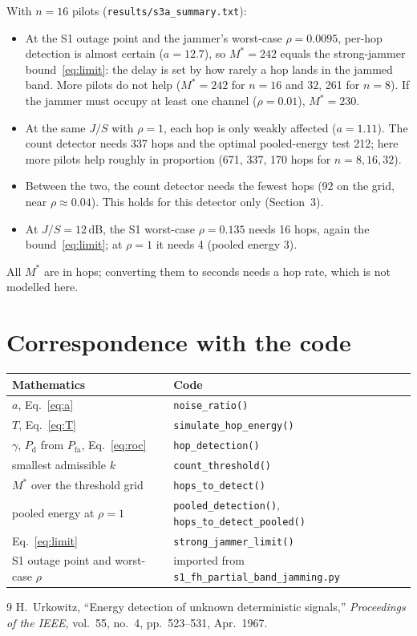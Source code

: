 \documentclass[11pt,a4paper]{article}
\newcommand{\Pfa}{P_{\mathrm{fa}}}
\newcommand{\Pd}{P_{\mathrm{d}}}
\begin{document}
With $n=16$ pilots (\texttt{results/s3a\_summary.txt}):
\begin{itemize}[leftmargin=*,itemsep=2pt]
\item At the S1 outage point and the jammer's worst-case $\rho = 0.0095$, per-hop
detection is almost certain ($a=12.7$), so $M^\ast = 242$ equals the
strong-jammer bound~\eqref{eq:limit}: the delay is set by how rarely a hop lands
in the jammed band. More pilots do not help ($M^\ast = 242$ for $n=16$ and $32$,
261 for $n=8$). If the jammer must occupy at least one channel ($\rho = 0.01$),
$M^\ast = 230$.
\item At the same $J/S$ with $\rho=1$, each hop is only weakly affected
($a=1.11$). The count detector needs 337 hops and the optimal pooled-energy test
212; here more pilots help roughly in proportion (671, 337, 170 hops for
$n = 8, 16, 32$).
\item Between the two, the count detector needs the fewest hops (92 on the grid,
near $\rho\approx0.04$). This holds for this detector only (Section~3).
\item At $J/S = 12$\,dB, the S1 worst-case $\rho = 0.135$ needs 16 hops, again the
bound~\eqref{eq:limit}; at $\rho=1$ it needs 4 (pooled energy 3).
\end{itemize}
All $M^\ast$ are in hops; converting them to seconds needs a hop rate, which
is not modelled here.

\section{Correspondence with the code}

\begin{center}
\begin{tabular}{@{}ll@{}}
\toprule
Mathematics & Code \\
\midrule
$a$, Eq.~\eqref{eq:a} & \texttt{noise\_ratio()} \\
$T$, Eq.~\eqref{eq:T} & \texttt{simulate\_hop\_energy()} \\
$\gamma$, $\Pd$ from $\Pfa$, Eq.~\eqref{eq:roc} & \texttt{hop\_detection()} \\
smallest admissible $k$ & \texttt{count\_threshold()} \\
$M^\ast$ over the threshold grid & \texttt{hops\_to\_detect()} \\
pooled energy at $\rho=1$ & \texttt{pooled\_detection()}, \texttt{hops\_to\_detect\_pooled()} \\
Eq.~\eqref{eq:limit} & \texttt{strong\_jammer\_limit()} \\
S1 outage point and worst-case $\rho$ & imported from \texttt{s1\_fh\_partial\_band\_jamming.py} \\
\bottomrule
\end{tabular}
\end{center}

\begin{thebibliography}{9}
 H.~Urkowitz, ``Energy detection of unknown deterministic
  signals,'' \emph{Proceedings of the IEEE}, vol.~55, no.~4, pp.~523--531, Apr.\ 1967.
\end{thebibliography}
\end{document}
